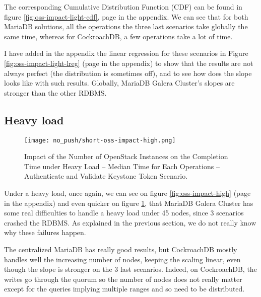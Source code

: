 The corresponding Cumulative Distribution Function (CDF) can be found in figure \ref{fig:oss-impact-light-cdf}, page \pageref{fig:oss-impact-light-cdf} in the appendix. We can see that for both MariaDB solutions, all the operations the three last scenarios take globally the same time, whereas for CockroachDB, a few operations take a lot of time.

I have added in the appendix the linear regression for these scenarios in Figure \ref{fig:oss-impact-light-lreg} (page \pageref{fig:oss-impact-light-lreg} in the appendix) to show that the results are not always perfect (the distribution is sometimes off), and to see how does the slope looks like with such results. Globally, MariaDB Galera Cluster's slopes are stronger than the other RDBMS.



\subsection{Heavy load}

\begin{figure}[H]
  \vspace{-10pt}
  \centering
  \centerline{\texttt{[image: no\_push/short-oss-impact-high.png]}}
  \vspace{-5pt}
  \caption{Impact of the Number of OpenStack Instances on the Completion Time under Heavy Load – Median Time for Each Operations – Authenticate and Validate Keystone Token Scenario.}
  \vspace{-5pt}
  \label{fig:short-oss-impact-high}
\end{figure}



Under a heavy load, once again, we can see on figure \ref{fig:oss-impact-high} (page \pageref{fig:oss-impact-high} in the appendix) and even quicker on figure \ref{fig:short-oss-impact-high}, that MariaDB Galera Cluster has some real difficulties to handle a heavy load under 45 nodes, since 3 scenarios crashed the RDBMS. As explained in the previous section, we do not really know why these failures happen.

The centralized MariaDB has really good results, but CockroachDB mostly handles well the increasing number of nodes, keeping the scaling linear, even though the slope is stronger on the 3 last scenarios. Indeed, on CockroachDB, the writes go through the quorum so the number of nodes does not really matter except for the queries implying multiple ranges and so need to be distributed.

